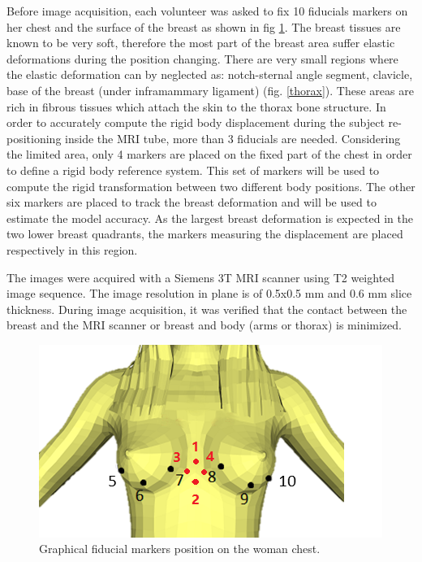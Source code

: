  Before image acquisition, each volunteer was asked to fix 10 fiducials markers on her chest and the surface of the breast as shown in fig \ref{fiducial_position}. The breast tissues are known to be very soft, therefore the most part of the breast area suffer elastic deformations during the position changing. There are very small regions where the elastic deformation can by neglected as: notch-sternal angle segment, clavicle, base of the breast (under inframammary ligament) (fig. \ref{thorax}). These areas are rich in fibrous tissues which attach the skin to the thorax bone structure. In order to accurately compute the rigid body displacement during the subject re-positioning inside the MRI tube, more than 3 fiducials are needed. Considering the limited area, only 4 markers are placed on the fixed part of the chest in order to define a rigid body reference system. This set of markers will be used to compute the rigid transformation between two different body positions. The other six markers are placed to track the breast deformation and will be used to estimate the model accuracy. As the largest breast deformation is expected in the two lower breast quadrants, the markers measuring the displacement are placed respectively in this region.  
 
 
 The images were acquired with a Siemens 3T MRI scanner using T2 weighted image sequence. The image resolution in plane is of 0.5x0.5 mm and 0.6 mm slice thickness. During image acquisition, it was verified that the contact between the breast and the MRI scanner or breast and body (arms or thorax) is minimized.


\begin{center}
\begin{figure}[H]
\centerline{\includegraphics[scale=0.7]{figures/fiducial_position2.png} }
\caption{Graphical fiducial markers position on the woman chest.}
\label{fiducial_position}
\end{figure}
\end{center}

